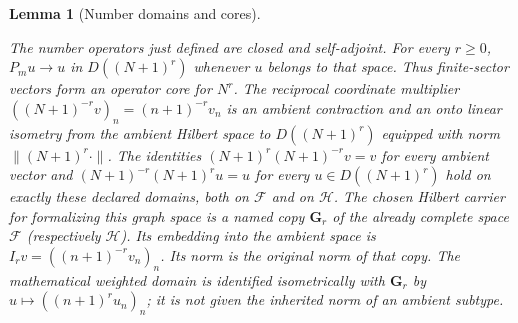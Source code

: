 \documentclass[11pt,a4paper]{article}
\newtheorem{lemma}[theorem]{Lemma}
\theoremstyle{definition}
\theoremstyle{remark}
\newcommand{\proofid}[1]{\par\smallskip{\normalfont\scriptsize\color{inkblue}Stable ID: \nolinkurl{#1}}\par\smallskip}
\begin{document}
\begin{lemma}[Number domains and cores]\label{fock:number-core}
\proofid{fock:number-core}
\par{}\par\smallskip

The number operators just defined are closed and self-adjoint. For every
$r\geq0$, $P_mu\to u$ in $D((N+1)^r)$ whenever $u$ belongs to that
space. Thus finite-sector vectors form an operator core for $N^r$.
The reciprocal coordinate multiplier
$((N+1)^{-r}v)_n=(n+1)^{-r}v_n$ is an ambient contraction and
an onto linear isometry from the ambient Hilbert space to
$D((N+1)^r)$ equipped with norm $\|(N+1)^r\cdot\|$.
The identities $(N+1)^r(N+1)^{-r}v=v$ for every ambient vector
and $(N+1)^{-r}(N+1)^ru=u$ for every $u\in D((N+1)^r)$ hold
on exactly these declared domains, both on $\mathcal F$ and
on $\mathcal H$.
The chosen Hilbert carrier for formalizing this graph space is a
named copy $\mathbf G_r$ of the already complete space $\mathcal F$
(respectively $\mathcal H$). Its embedding into the ambient space is
$I_rv=((n+1)^{-r}v_n)_n$. Its norm is the original norm of that
copy. The mathematical weighted domain is identified isometrically
with $\mathbf G_r$ by $u\mapsto((n+1)^ru_n)_n$; it is not given
the inherited norm of an ambient subtype.
\end{lemma}
\end{document}
